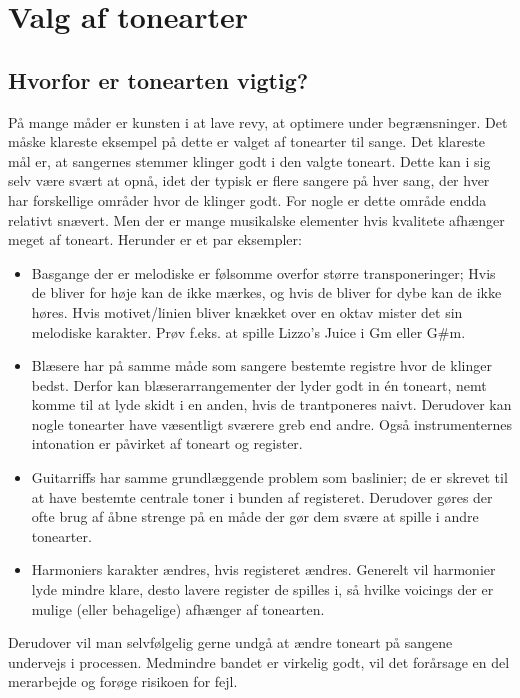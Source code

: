 \section{Valg af tonearter}
\subsection{Hvorfor er tonearten vigtig?}
På mange måder er kunsten i at lave revy, at optimere under begrænsninger.
Det måske klareste eksempel på dette er valget af tonearter til sange.
Det klareste mål er, at sangernes stemmer klinger godt i den valgte toneart. Dette kan i sig selv være svært at opnå, idet der typisk er flere sangere på hver sang, der hver har forskellige områder hvor de klinger godt. For nogle er dette område endda relativt snævert.
Men der er mange musikalske elementer hvis kvalitete afhænger meget af toneart. Herunder er et par eksempler:
\begin{itemize}
    \item Basgange der er melodiske er følsomme overfor større transponeringer; Hvis de bliver for høje kan de ikke mærkes, og hvis de bliver for dybe kan de ikke høres. Hvis motivet/linien bliver knækket over en oktav mister det sin melodiske karakter. Prøv f.eks. at spille Lizzo's Juice i Gm eller G\#m.
    \item Blæsere har på samme måde som sangere bestemte registre hvor de klinger bedst. Derfor kan blæserarrangementer der lyder godt in én toneart, nemt komme til at lyde skidt i en anden, hvis de trantponeres naivt. Derudover kan nogle tonearter have væsentligt sværere greb end andre. Også instrumenternes intonation er påvirket af toneart og register. 
    \item Guitarriffs har samme grundlæggende problem som baslinier; de er skrevet til at have bestemte centrale toner i bunden af registeret. Derudover gøres der ofte brug af åbne strenge på en måde der gør dem svære at spille i andre tonearter.
    \item Harmoniers karakter ændres, hvis registeret ændres. Generelt vil harmonier lyde mindre klare, desto lavere register de spilles i, så hvilke voicings der er mulige (eller behagelige) afhænger af tonearten.
\end{itemize}

Derudover vil man selvfølgelig gerne undgå at ændre toneart på sangene undervejs i processen. Medmindre bandet er virkelig godt, vil det forårsage en del merarbejde og forøge risikoen for fejl.

